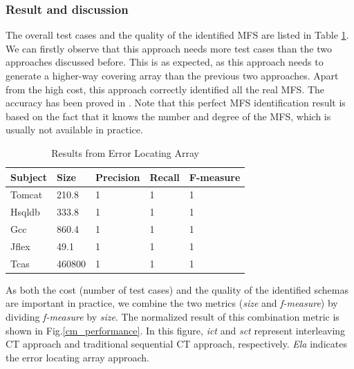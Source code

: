 \documentclass{sig-alternate}
\begin{document}




\subsubsection{Result and discussion}
The overall test cases and the quality of the identified MFS are listed in Table \ref{cm_ela}. We can firstly observe that this approach needs more test cases than the two approaches discussed before. This is as expected, as this approach needs to generate a higher-way covering array than the previous two approaches. Apart from the high cost, this approach correctly identified all the real MFS. The accuracy has been proved in \cite{martinez2008algorithms,martinez2009locating}.  Note that this perfect MFS identification result is based on the fact that it knows the number and degree of the MFS, which is usually not available in practice.


\begin{table}[htbp]
\center
\caption{Results from Error Locating Array}
\label{cm_ela}
\begin{tabular}{|l|llll|}
\hline
Subject & Size   & Precision & Recall & F-measure \\ \hline
Tomcat  & 210.8  & 1       & 1      & 1         \\
Hsqldb  & 333.8  & 1       & 1      & 1         \\
Gcc      & 860.4 & 1       & 1      & 1         \\
Jflex   & 49.1   & 1       & 1      & 1         \\
Tcas    & 460800 & 1       & 1      & 1         \\ \hline
\end{tabular}
\end{table}


As both the cost (number of test cases) and the quality of the identified schemas are important in practice, we combine the two metrics (\emph{size} and \emph{f-measure}) by dividing \emph{f-measure} by \emph{size}. The normalized result of this combination metric is shown in Fig.\ref{cm_performance}. In this figure, \emph{ict} and \emph{sct} represent interleaving CT approach and traditional sequential CT approach, respectively. \emph{Ela} indicates the error locating array approach.
\end{document}
